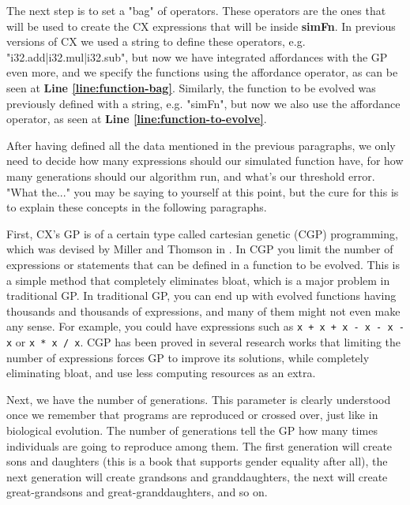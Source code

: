 \documentclass[11pt,fleqn,openany]{book} %
\begin{document}
The next step is to set a "bag" of operators. These operators are the ones that will be used to create the CX expressions that will be inside \textbf{simFn}. In previous versions of CX we used a string to define these operators, e.g. "i32.add|i32.mul|i32.sub", but now we have integrated affordances with the GP even more, and we specify the functions using the affordance operator, as can be seen at \textbf{Line \ref{line:function-bag}}. Similarly, the function to be evolved was previously defined with a string, e.g. "simFn", but now we also use the affordance operator, as seen at \textbf{Line \ref{line:function-to-evolve}}.

After having defined all the data mentioned in the previous paragraphs, we only need to decide how many expressions should our simulated function have, for how many generations should our algorithm run, and what's our threshold error. "What the..." you may be saying to yourself at this point, but the cure for this is to explain these concepts in the following paragraphs.

First, CX's GP is of a certain type called cartesian genetic (CGP) programming, which was devised by Miller and Thomson in \cite{miller2000cartesian}. In CGP you limit the number of expressions or statements that can be defined in a function to be evolved. This is a simple method that completely eliminates bloat, which is a major problem in traditional GP. In traditional GP, you can end up with evolved functions having thousands and thousands of expressions, and many of them might not even make any sense. For example, you could have expressions such as \lstinline{x + x + x - x - x - x} or \lstinline{x * x / x}. CGP has been proved in several research works that limiting the number of expressions forces GP to improve its solutions, while completely eliminating bloat, and use less computing resources as an extra.

Next, we have the number of generations. This parameter is clearly understood once we remember that programs are reproduced or crossed over, just like in biological evolution. The number of generations tell the GP how many times individuals are going to reproduce among them. The first generation will create sons and daughters (this is a book that supports gender equality after all), the next generation will create grandsons and granddaughters, the next will create great-grandsons and great-granddaughters, and so on.
\end{document}
